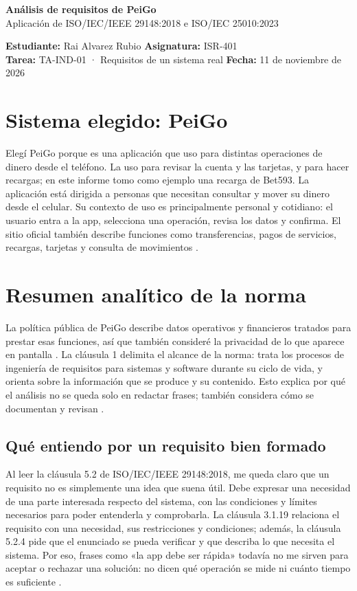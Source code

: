 \documentclass[10pt,letterpaper]{article}
\begin{document}
\begin{center}
{\Large\bfseries\color{azul} Análisis de requisitos de PeiGo}\\
{\normalsize Aplicación de ISO/IEC/IEEE 29148:2018 e ISO/IEC 25010:2023}
\end{center}
\textbf{Estudiante:} Rai Alvarez Rubio \hfill \textbf{Asignatura:} ISR-401\\
\textbf{Tarea:} TA-IND-01 · Requisitos de un sistema real \hfill \textbf{Fecha:} 11 de noviembre de 2026

\section{Sistema elegido: PeiGo}
Elegí PeiGo porque es una aplicación que uso para distintas operaciones de dinero desde el teléfono. La uso para revisar la cuenta y las tarjetas, y para hacer recargas; en este informe tomo como ejemplo una recarga de Bet593. La aplicación está dirigida a personas que necesitan consultar y mover su dinero desde el celular. Su contexto de uso es principalmente personal y cotidiano: el usuario entra a la app, selecciona una operación, revisa los datos y confirma. El sitio oficial también describe funciones como transferencias, pagos de servicios, recargas, tarjetas y consulta de movimientos \cite{peigoFaq,peigoTerms}.

\section{Resumen analítico de la norma}
La política pública de PeiGo describe datos operativos y financieros tratados para prestar esas funciones, así que también consideré la privacidad de lo que aparece en pantalla \cite{peigoPrivacy}.
La cláusula 1 delimita el alcance de la norma: trata los procesos de ingeniería de requisitos para sistemas y software durante su ciclo de vida, y orienta sobre la información que se produce y su contenido. Esto explica por qué el análisis no se queda solo en redactar frases; también considera cómo se documentan y revisan \cite[cl. 1]{iso29148}.
\subsection{Qué entiendo por un requisito bien formado}
Al leer la cláusula 5.2 de ISO/IEC/IEEE 29148:2018, me queda claro que un requisito no es simplemente una idea que suena útil. Debe expresar una necesidad de una parte interesada respecto del sistema, con las condiciones y límites necesarios para poder entenderla y comprobarla. La cláusula 3.1.19 relaciona el requisito con una necesidad, sus restricciones y condiciones; además, la cláusula 5.2.4 pide que el enunciado se pueda verificar y que describa lo que necesita el sistema. Por eso, frases como «la app debe ser rápida» todavía no me sirven para aceptar o rechazar una solución: no dicen qué operación se mide ni cuánto tiempo es suficiente \cite{iso29148}.
\end{document}
